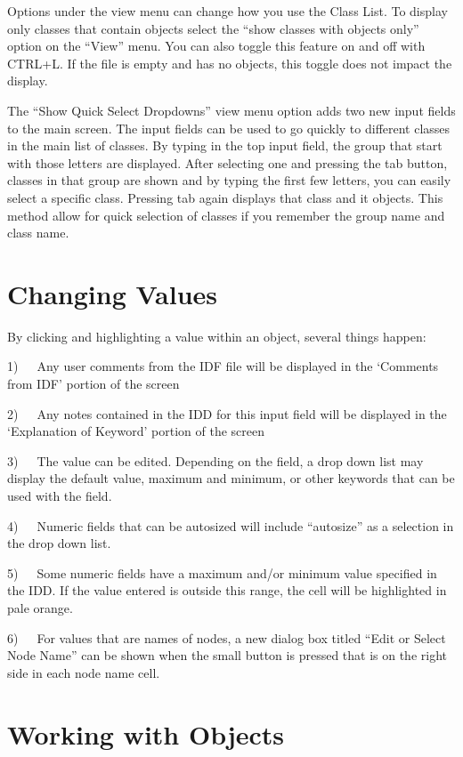 Options under the view menu can change how you use the Class List. To display only classes that contain objects select the ``show classes with objects only'' option on the ``View'' menu. You can also toggle this feature on and off with CTRL+L. If the file is empty and has no objects, this toggle does not impact the display.

The ``Show Quick Select Dropdowns'' view menu option adds two new input fields to the main screen. The input fields can be used to go quickly to different classes in the main list of classes. By typing in the top input field, the group that start with those letters are displayed. After selecting one and pressing the tab button, classes in that group are shown and by typing the first few letters, you can easily select a specific class. Pressing tab again displays that class and it objects. This method allow for quick selection of classes if you remember the group name and class name.

\section{Changing Values}\label{changing-values}

By clicking and highlighting a value within an object, several things happen:

1)~~~Any user comments from the IDF file will be displayed in the `Comments from IDF' portion of the screen

2)~~~Any notes contained in the IDD for this input field will be displayed in the `Explanation of Keyword' portion of the screen

3)~~~The value can be edited. Depending on the field, a drop down list may display the default value, maximum and minimum, or other keywords that can be used with the field.

4)~~~Numeric fields that can be autosized will include ``autosize'' as a selection in the drop down list.

5)~~~Some numeric fields have a maximum and/or minimum value specified in the IDD. If the value entered is outside this range, the cell will be highlighted in pale orange.

6)~~~For values that are names of nodes, a new dialog box titled ``Edit or Select Node Name'' can be shown when the small button is pressed that is on the right side in each node name cell.

\section{Working with Objects}\label{working-with-objects}

